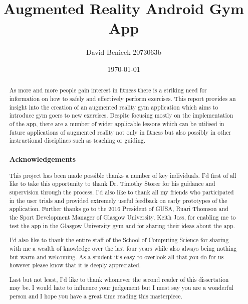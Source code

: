 \documentclass{l4proj}
\begin{document}
\title{Augmented Reality Android Gym App}
\author{David Benicek 2073063b}
\date{\today}
\maketitle

\begin{abstract}
As more and more people gain interest in fitness there is a striking need for information on how to safely and effectively perform exercises. This report provides an insight into the creation of an augmented reality gym application which aims to introduce gym goers to new exercises. Despite focusing mostly on the implementation of the app, there are a number of wider applicable lessons which can be utilised in future applications of augmented reality not only in fitness but also possibly in other instructional disciplines such as teaching or guiding.
\subsubsection*{\hfil Acknowledgements\hfil}
This project has been made possible thanks a number of key individuals. I'd first of all like to take this opportunity to thank Dr. Timothy Storer for his guidance and supervision through the process. I'd also like to thank all my friends who participated in the user trials and provided extremely useful feedback on early prototypes of the application. Further thanks go to the 2016 President of GUSA, Ruari Thomson and the Sport Development Manager of Glasgow University, Keith Joss, for enabling me to test the app in the Glasgow University gym and for sharing their ideas about the app.

I'd also like to thank the entire staff of the School of Computing Science for sharing with me a wealth of knowledge over the last four years while also always being nothing but warm and welcoming. As a student it's easy to overlook all that you do for us however please know that it is deeply appreciated. 

Last but not least, I'd like to thank whomever the second reader of this dissertation may be. I would hate to influence your judgement but I must say you are a wonderful person and I hope you have a great time reading this masterpiece.


\end{abstract}

\educationalconsent
%
%
\tableofcontents
\end{document}
